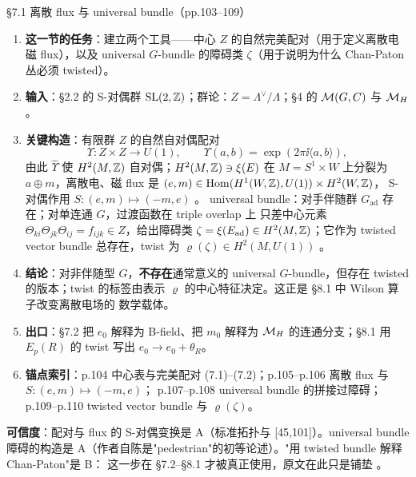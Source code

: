 \begin{kcard}{\S7.1 离散 flux 与 universal bundle（pp.103--109）}
\begin{enumerate}[label=\textbf{\arabic*}]
\item \textbf{这一节的任务}：建立两个工具——中心 $Z$ 的自然完美配对（用于定义离散电磁 flux），以及
  universal $G$-bundle 的障碍类 $\zeta$（用于说明为什么 Chan-Paton 丛必须 twisted）。
\item \textbf{输入}：\S2.2 的 S-对偶群 $\mathrm{SL}(2,\mathbb{Z})$；群论：$Z=\Lambda^\vee/\Lambda$；\S4 的
  $\mathcal{M}(G,C)$ 与 $\mathcal{M}_H$。
\item \textbf{关键构造}：有限群 $Z$ 的自然自对偶配对
\begin{equation}
\Upsilon:Z\times Z\to U(1),\qquad \Upsilon(a,b)=\exp(2\pi\ii\langle a,b\rangle),
\label{eq:geom-pairing}
\end{equation}
  由此 $\hat\Upsilon$ 使 $H^2(M,\mathbb{Z})$ 自对偶；$H^2(M,\mathbb{Z})\ni\xi(E)$ 在 $M=S^1\times W$ 上分裂为
  $a\oplus m$，离散电、磁 flux 是 $(e,m)\in \mathrm{Hom}(H^1(W,\mathbb{Z}),U(1))\times H^2(W,\mathbb{Z})$，
  S-对偶作用 $S:(e,m)\mapsto(-m,e)$ \pA{}。
  universal bundle：对手伴随群 $G_{\mathrm{ad}}$ 存在；对单连通 $G$，过渡函数在 triple overlap 上
  只差中心元素 $\Theta_{ki}\Theta_{jk}\Theta_{ij}=f_{ijk}\in Z$，给出障碍类
  $\zeta=\xi(E_{\mathrm{ad}})\in H^2(M,\mathbb{Z})$；它作为 twisted vector bundle 总存在，twist 为
  $\varrho(\zeta)\in H^2(M,U(1))$ \pA{}。
\item \textbf{结论}：对非伴随型 $G$，\textbf{不存在}通常意义的 universal $G$-bundle，但存在 twisted
  的版本；twist 的标签由表示 $\varrho$ 的中心特征决定。这正是 \S8.1 中 Wilson 算子改变离散电场的
  数学载体。
\item \textbf{出口}：\S7.2 把 $e_0$ 解释为 B-field、把 $m_0$ 解释为 $\mathcal{M}_H$ 的连通分支；\S8.1 用
  $E_p(R)$ 的 twist 写出 $e_0\to e_0+\theta_R$。
\item \textbf{锚点索引}：p.104 中心表与完美配对 (7.1)--(7.2)；p.105--p.106 离散 flux 与 $S:(e,m)\mapsto(-m,e)$；
  p.107--p.108 universal bundle 的拼接过障碍；p.109--p.110 twisted vector bundle 与 $\varrho(\zeta)$。
\end{enumerate}
\textbf{可信度}：配对与 flux 的 S-对偶变换是 A（标准拓扑与 [45,101]）。universal bundle 障碍的构造是
A（作者自陈是"pedestrian"的初等论述）\pA{}。"用 twisted bundle 解释 Chan-Paton"是 B：
这一步在 \S7.2--\S8.1 才被真正使用，原文在此只是铺垫 \pB{}。
\end{kcard}

